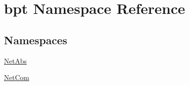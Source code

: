 \hypertarget{namespacebpt}{\section{bpt Namespace Reference}
\label{namespacebpt}
}
\subsection*{Namespaces}
\begin{DoxyCompactItemize}
\item 
\hyperlink{namespacebpt_1_1_net_abs}{Net\-Abs}
\item 
\hyperlink{namespacebpt_1_1_net_com}{Net\-Com}
\end{DoxyCompactItemize}
